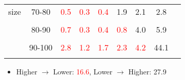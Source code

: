 \documentclass{beamer}
\begin{document}
{\begin{table}[t]
\begin{center}
\begin{tabular}{ccccccccc
        }
        size                                                     & 70-80                                     & \textcolor{red}{0.5} & \textcolor{red}{0.3} & \textcolor{red}{0.4} & 1.9                  & 2.1                  & 2.8      \\
                                                                 &                                           &                      &                      &                      &                      &                      &          \\
                                                                 & 80-90                                     & \textcolor{red}{0.7} & \textcolor{red}{0.3} & \textcolor{red}{0.4} & \textcolor{red}{0.8} & 4.0                  & 5.9      \\
                                                                 &                                           &                      &                      &                      &                      &                      &          \\
                                                                 & 90-100                                    & \textcolor{red}{2.8} & \textcolor{red}{1.2} & \textcolor{red}{1.7} & \textcolor{red}{2.3} & \textcolor{red}{4.2} & 44.1     \\
        \\\hline
      \end{tabular}
    \end{center}
  \end{table}
  \begin{itemize}
    \item Higher $\rightarrow$ Lower: \textcolor{red}{16.6},  Lower $\rightarrow$ Higher: 27.9
  \end{itemize}
}
\end{document}
